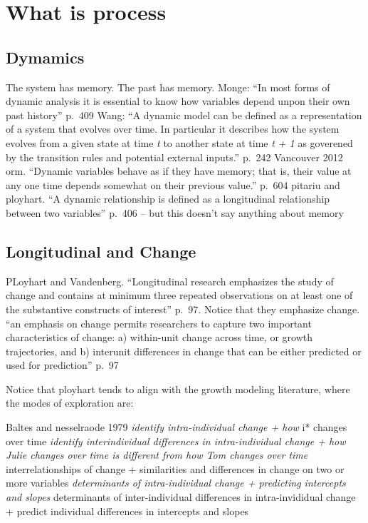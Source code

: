 \documentclass[english,,man]{apa6}
\theoremstyle{definition}
\theoremstyle{definition}
\theoremstyle{definition}
\theoremstyle{remark}
\begin{document}
\hypertarget{what-is-process}{%
\section{What is process}\label{what-is-process}}

\hypertarget{dymamics}{%
\subsection{Dymamics}\label{dymamics}}

The system has memory. The past has memory. Monge: \enquote{In most
forms of dynamic analysis it is essential to know how variables depend
unpon their own past history} p.~409 Wang: \enquote{A dynamic model can
be defined as a representation of a system that evolves over time. In
particular it describes how the system evolves from a given state at
time \emph{t} to another state at time \emph{t + 1} as goverened by the
transition rules and potential external inputs.} p.~242 Vancouver 2012
orm. \enquote{Dynamic variables behave as if they have memory; that is,
their value at any one time depends somewhat on their previous value.}
p.~604 pitariu and ployhart. \enquote{A dynamic relationship is defined
as a longitudinal relationship between two variables} p.~406 -- but this
doesn't say anything about memory

\hypertarget{longitudinal-and-change}{%
\subsection{Longitudinal and Change}\label{longitudinal-and-change}}

PLoyhart and Vandenberg. \enquote{Longitudinal research emphasizes the
study of change and contains at minimum three repeated observations on
at least one of the substantive constructs of interest} p.~97. Notice
that they emphasize change. \enquote{an emphasis on change permits
researchers to capture two important characteristics of change: a)
within-unit change across time, or growth trajectories, and b) interunit
differences in change that can be either predicted or used for
prediction} p.~97

Notice that ployhart tends to align with the growth modeling literature,
where the modes of exploration are:

Baltes and nesselraode 1979 \emph{identify intra-individual change + how
}i* changes over time \emph{identify interindividual differences in
intra-individual change + how Julie changes over time is different from
how Tom changes over time }interrelationships of change + similarities
and differences in change on two or more variables \emph{determinants of
intra-individual change + predicting intercepts and slopes }determinants
of inter-individual differences in intra-invididual change + predict
individual differences in intercepts and slopes
\end{document}
